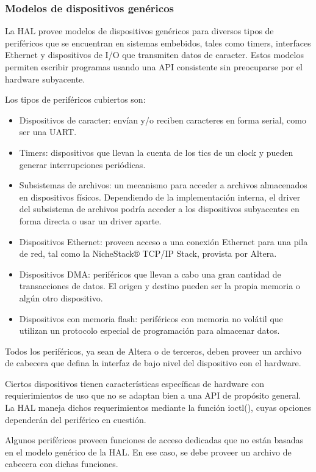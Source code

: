 \subsubsection{Modelos de dispositivos genéricos}

La HAL provee modelos de dispositivos genéricos para diversos tipos de periféricos que se encuentran en sistemas embebidos, tales como timers, interfaces Ethernet y dispositivos de I/O que transmiten datos de caracter. Estos modelos permiten escribir programas usando una API consistente sin preocuparse por el hardware subyacente.

Los tipos de periféricos cubiertos son:

\begin{itemize}
	\item Dispositivos de caracter: envían y/o reciben caracteres en forma serial, como ser una UART.
	\item Timers: dispositivos que llevan la cuenta de los tics de un clock y pueden generar interrupciones periódicas.
	\item Subsistemas de archivos: un mecanismo para acceder a archivos almacenados en dispositivos físicos. Dependiendo de la implementación interna, el driver del subsistema de archivos podría acceder a los dispositivos subyacentes en forma directa o usar un driver aparte.
	\item Dispositivos Ethernet: proveen acceso a una conexión Ethernet para una pila de red, tal como la NicheStack® TCP/IP Stack, provista por Altera.
	\item Dispositivos DMA: periféricos que llevan a cabo una gran cantidad de transacciones de datos. El origen y destino pueden ser la propia memoria o algún otro dispositivo.
	\item Dispositivos con memoria flash: periféricos con memoria no volátil que utilizan un protocolo especial de programación para almacenar datos.
\end{itemize}

Todos los periféricos, ya sean de Altera o de terceros, deben proveer un archivo de cabecera que defina la interfaz de bajo nivel del dispositivo con el hardware. 

Ciertos dispositivos tienen características específicas de hardware con requierimientos de uso que no se adaptan bien a una API de propósito general. La HAL maneja dichos requerimientos mediante la función ioctl(), cuyas opciones dependerán del periférico en cuestión.

Algunos periféricos proveen funciones de acceso dedicadas que no están basadas en el modelo genérico de la HAL. En ese caso, se debe proveer un archivo de cabecera con dichas funciones.


